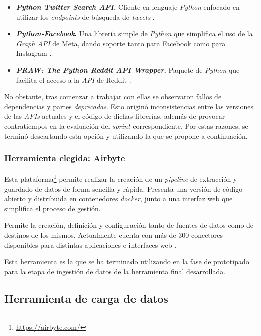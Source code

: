 \begin{itemize}
    \item \textbf{\textit{Python Twitter Search API}.} Cliente en lenguaje \textit{Python} enfocado en utilizar los \textit{endpoints} de búsqueda de \textit{tweets} \cite{twitterSearchAPI}.
    \item \textbf{\textit{Python-Facebook}.} Una librería simple de \textit{Python} que simplifica el uso de la \textit{Graph API} de Meta, dando soporte tanto para Facebook como para Instagram \cite{facebookAPIsearch}.
    \item \textbf{\textit{PRAW: The Python Reddit API Wrapper}.} Paquete de \textit{Python} que facilita el acceso a la \textit{API} de Reddit \cite{redditPRAW}.
\end{itemize}

No obstante, tras comenzar a trabajar con ellas se observaron fallos de dependencias y partes \textit{deprecadas}. Esto originó inconsistencias entre las versiones de las \textit{APIs} actuales y el código de dichas librerías, además de provocar contratiempos en la evaluación del \textit{sprint} correspondiente. Por estas razones, se terminó descartando esta opción y utilizando la que se propone a continuación. 

\subsubsection{Herramienta elegida: Airbyte}

Esta plataforma\footnote{\url{https://airbyte.com/}} permite realizar la creación de un \textit{pipeline} de extracción y guardado de datos de forma sencilla y rápida. Presenta una versión de código abierto y distribuida en contenedores \textit{docker}, junto a una interfaz web que simplifica el proceso de gestión.

Permite la creación, definición y configuración tanto de fuentes de datos como de destinos de los mismos. Actualmente cuenta con más de 300 conectores disponibles para distintas aplicaciones e interfaces web \cite{airbyteConnectors}.

Esta herramienta es la que se ha terminado utilizando en la fase de prototipado para la etapa de ingestión de datos de la herramienta final desarrollada.

\subsection{Herramienta de carga de datos}


